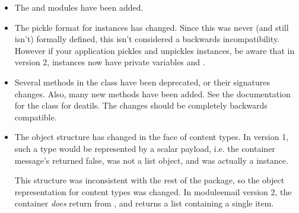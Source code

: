 \begin{itemize}
\item The  and  modules
      have been added.
\item The pickle format for  instances has changed.
      Since this was never (and still isn't) formally defined, this
      isn't considered a backwards incompatibility.  However if your
      application pickles and unpickles  instances, be
      aware that in  version 2, 
      instances now have private variables  and
      .
\item Several methods in the  class have been
      deprecated, or their signatures changes.  Also, many new methods
      have been added.  See the documentation for the 
      class for deatils.  The changes should be completely backwards
      compatible.
\item The object structure has changed in the face of
       content types.  In 
      version 1, such a type would be represented by a scalar payload,
      i.e. the container message's  returned
      false,  was not a list object, and was
      actually a  instance.

      This structure was inconsistent with the rest of the package, so
      the object representation for  content
      types was changed.  In module{email} version 2, the container
      \emph{does} return  from , and
       returns a list containing a single
       item.


\end{itemize}
